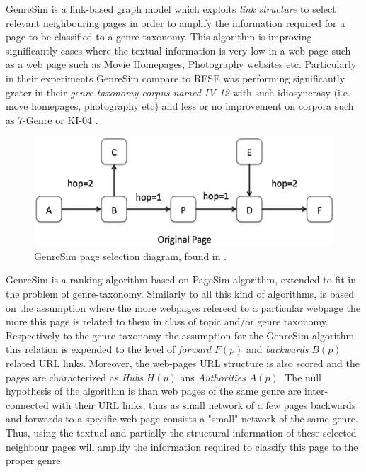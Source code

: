 GenreSim is a link-based graph model which exploits \textit{link structure} to select relevant neighbouring pages in order to amplify the information required for a page to be classified to a genre taxonomy. This algorithm is improving significantly cases where the textual information is very low in a web-page such as a web page such as Movie Homepages, Photography websites etc. Particularly in their experiments GenreSim compare to RFSE was performing significantly grater in their \textit{genre-taxonomy corpus named IV-12} with such idiosyncrasy (i.e. move homepages, photography etc) and less or no improvement on corpora such as 7-Genre or KI-04 \parencite{zhu2011enhance,zhu2016exploiting}.

\begin{figure}[t]
	\begin{center}
    	\includegraphics[scale=0.95]{Figures/GenreSim_Draw.eps}
		\caption{GenreSim page selection diagram, found in  \parencite{zhu2016exploiting}.}
		\label{fiig:GenreSim_Draw}
	\end{center}
\end{figure}

GenreSim is a ranking algorithm based on PageSim algorithm, extended to fit in the problem of genre-taxonomy. Similarly to all this kind of algorithms, is based on the assumption where the more webpages refereed to a particular webpage the more this page is related to them in class of topic and/or genre taxonomy. Respectively to the genre-taxonomy the assumption for the GenreSim algorithm this relation is expended to the level of \textit{forward} $F(p)$ and \textit{backwards} $B(p)$ related URL links. Moreover, the web-pages URL structure is also scored and the pages are characterized as \textit{Hubs} $H(p)$ ans \textit{Authorities} $A(p)$. The null hypothesis of the algorithm is than web pages of the same genre are inter-connected with their URL links, thus as small network of a few pages backwards and forwards to a specific web-page consists a "small" network of the same genre. Thus, using the textual and partially the structural information of these selected neighbour pages will amplify the information required to classify this page to the proper genre.

